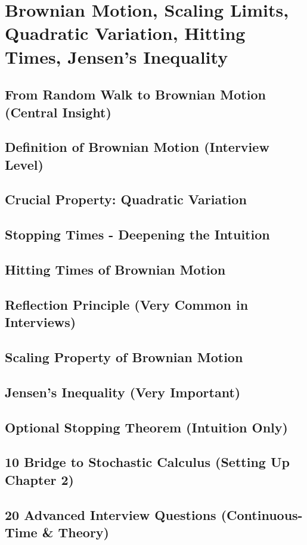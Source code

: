 \documentclass{report}
\begin{document}
\section{Brownian Motion, Scaling Limits, Quadratic Variation, Hitting Times, Jensen's Inequality}

\subsection*{From Random Walk to Brownian Motion (Central Insight)}
\subsection*{Definition of Brownian Motion (Interview Level)}
\subsection*{Crucial Property: Quadratic Variation}
\subsection*{Stopping Times - Deepening the Intuition}
\subsection*{Hitting Times of Brownian Motion}
\subsection*{Reflection Principle (Very Common in Interviews)}
\subsection*{Scaling Property of Brownian Motion}
\subsection*{Jensen's Inequality (Very Important)}
\subsection*{Optional Stopping Theorem (Intuition Only)}
\subsection*{10 Bridge to Stochastic Calculus (Setting Up Chapter 2)}
\subsection*{20 Advanced Interview Questions (Continuous-Time \& Theory)}
\end{document}
